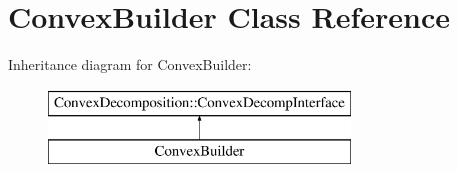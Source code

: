 \hypertarget{class_convex_builder}{\section{Convex\-Builder Class Reference}
\label{class_convex_builder}
}
Inheritance diagram for Convex\-Builder\-:\begin{figure}[H]
\begin{center}
\leavevmode
\includegraphics[height=2.000000cm]{class_convex_builder}
\end{center}
\end{figure}
